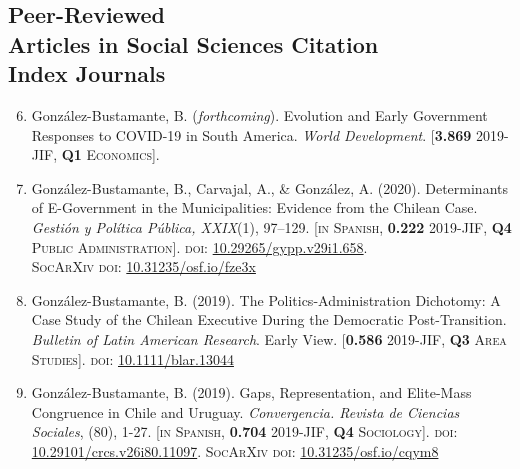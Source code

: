 \documentclass[letterpaper,margin]{res}
\newenvironment{benumerate}[1]{
    \let\oldItem\item
    \def\item{\addtocounter{enumi}{-2}\oldItem}
    \begin{enumerate}
    \setcounter{enumi}{#1}
    \addtocounter{enumi}{1}
}{
    \end{enumerate}
}
\begin{document}
\begin{resume}

\section{\footnotesize Peer-Reviewed \\ Articles in Social Sciences Citation \\ Index Journals}

\begin{benumerate}{5}
\item{\small Gonz\'alez-Bustamante, B. ({\itshape forthcoming}). Evolution and Early Government Responses to COVID-19 in South America. {\itshape World Development}. {\footnotesize \scshape [{\bfseries \small 3.869} 2019-JIF, {\bfseries \small Q1} Economics]}.}\vspace{1mm}

\item{\small Gonz\'alez-Bustamante, B., Carvajal, A., \& Gonz\'alez, A. (2020). Determinants of E-Government in the Municipalities: Evidence from the Chilean Case. {\itshape Gesti\'on y Pol\'itica P\'ublica, XXIX}(1), 97--129. {\footnotesize \scshape [in Spanish, {\bfseries \small 0.222} 2019-JIF, {\bfseries \small Q4} Public Administration]}. {\scshape doi:} \href{http://dx.doi.org/10.29265/gypp.v29i1.658}{10.29265/gypp.v29i1.658}. \\ {\scshape {\footnotesize SocArXiv} doi}: \href{https://doi.org/10.31235/osf.io/fze3x}{10.31235/osf.io/fze3x}}\vspace{1mm}

\item{\small Gonz\'alez-Bustamante, B. (2019). The Politics-Administration Dichotomy: A Case Study of the Chilean Executive During the Democratic Post-Transition. {\itshape Bulletin of Latin American Research}. Early View. {\footnotesize \scshape [{\bfseries \small 0.586} 2019-JIF, {\bfseries \small Q3} Area Studies]}. {\scshape doi}: \href{https://doi.org/10.1111/blar.13044}{10.1111/blar.13044}}\vspace{1mm}

\item{\small Gonz\'alez-Bustamante, B. (2019). Gaps, Representation, and Elite-Mass Congruence in Chile and Uruguay. {\itshape Convergencia. Revista de Ciencias Sociales}, (80), 1-27. {\footnotesize \scshape [in Spanish, {\bfseries \small 0.704} 2019-JIF, {\bfseries \small Q4} Sociology]}. {\scshape doi}: \href{https://doi.org/10.29101/crcs.v26i80.11097}{10.29101/crcs.v26i80.11097}. {\scshape {\footnotesize SocArXiv} doi}: \href{https://doi.org/10.31235/osf.io/cqym8}{10.31235/osf.io/cqym8}}\vspace{1mm}


\end{benumerate}
\end{resume}
\end{document}
